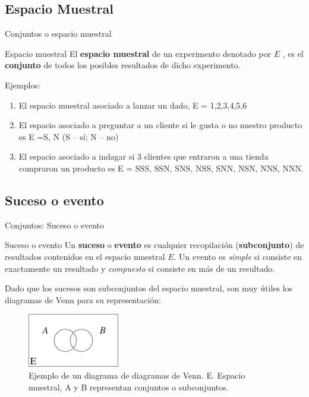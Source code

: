 \documentclass[11pt]{beamer}
\begin{document}
      \subsection*{Espacio Muestral}
        \begin{frame}{Conjuntos o espacio muestral}
          \begin{block}{Espacio muestral}
              El \textbf{espacio muestral} de un experimento denotado por $E$ , es el \textbf{conjunto} de todos los posibles resultados de dicho experimento.
          \end{block}
          \pause
          Ejemplos:
          \begin{enumerate}[<+->]
              \item El espacio muestral asociado a lanzar un dado, E = {1,2,3,4,5,6}
              \item El espacio asociado a preguntar a un cliente si le gusta o no nuestro producto es E ={S, N} (S – sí; N – no)
              \item El espacio asociado a indagar si 3 clientes que entraron a una tienda compraron un producto es E = {SSS, SSN, SNS, NSS, SNN, NSN, NNS, NNN}.
          \end{enumerate}
        \end{frame}
      \subsection*{Suceso o evento}
        \begin{frame}{Conjuntos: Suceso o evento}
          \begin{block}{Suceso o evento}
              Un \textbf{suceso} o \textbf{evento} es cualquier recopilación (\textbf{subconjunto}) de resultados contenidos en el espacio muestral $E$. Un evento es \textit{simple} si consiste en exactamente un resultado y \textit{compuesto} si consiste en más de un resultado.
          \end{block}
          \pause
          Dado que los sucesos son subconjuntos del espacio muestral, son muy útiles los diagramas de Venn para su representación:
          \begin{figure}
              \centering
              \includegraphics[width=0.3\linewidth]{images/estadistica1}
              \caption{Ejemplo de un diagrama de diagramas de Venn. E. Espacio muestral, A y B representan conjuntos o subconjuntos. }
              \label{fig:estadistica1}
          \end{figure}
        \end{frame}
\end{document}
